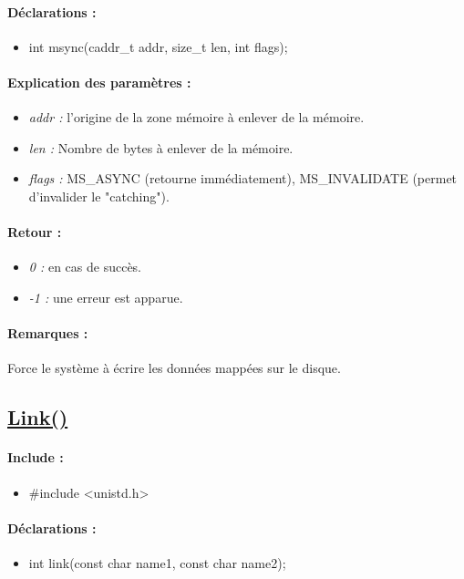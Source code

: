 \documentclass{article}[12pt]
\begin{document}
\paragraph{Déclarations : }
\begin{itemize}
	\item int msync(caddr\_t addr, size\_t len, int flags);
\end{itemize}
\paragraph{Explication des paramètres : }
\begin{itemize}
	\item \emph{addr : } l'origine de la zone mémoire à enlever de la mémoire.
	\item \emph{len : } Nombre de bytes à enlever de la mémoire.
	\item \emph{flags : } MS\_ASYNC (retourne immédiatement), MS\_INVALIDATE (permet d'invalider le "catching").
\end{itemize}
\paragraph{Retour : }
\begin{itemize}
	\item \emph{0 : } en cas de succès.
	\item \emph{-1 : } une erreur est apparue.
\end{itemize}
\paragraph{Remarques : }
Force le système à écrire les données mappées sur le disque.
\subsection{\href{http://jp.barralis.com/linux-man/man2/link.2.php}{Link()}}
\paragraph{Include : }
\begin{itemize}
	\item \#include <unistd.h>
\end{itemize}
\paragraph{Déclarations : }
\begin{itemize}
	\item int link(const char \* name1, const char \* name2);
\end{itemize}
\end{document}
